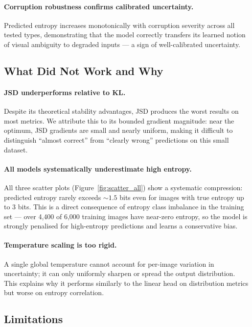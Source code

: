 \documentclass[11pt,a4paper]{article}
\begin{document}
\paragraph{Corruption robustness confirms calibrated uncertainty.}
Predicted entropy increases monotonically with corruption severity across all
tested types, demonstrating that the model correctly transfers its learned
notion of visual ambiguity to degraded inputs — a sign of well-calibrated
uncertainty.

\subsection{What Did Not Work and Why}

\paragraph{JSD underperforms relative to KL.}
Despite its theoretical stability advantages, JSD produces the worst results
on most metrics.
We attribute this to its bounded gradient magnitude: near the optimum, JSD
gradients are small and nearly uniform, making it difficult to distinguish
``almost correct'' from ``clearly wrong'' predictions on this small dataset.

\paragraph{All models systematically underestimate high entropy.}
All three scatter plots (Figure~\ref{fig:scatter_all}) show a systematic
compression: predicted entropy rarely exceeds ${\sim}1.5$ bits even for images
with true entropy up to $3$ bits.
This is a direct consequence of entropy class imbalance in the training set —
over 4,400 of 6,000 training images have near-zero entropy, so the model is
strongly penalised for high-entropy predictions and learns a conservative bias.

\paragraph{Temperature scaling is too rigid.}
A single global temperature cannot account for per-image variation in
uncertainty; it can only uniformly sharpen or spread the output distribution.
This explains why it performs similarly to the linear head on distribution
metrics but worse on entropy correlation.

\subsection{Limitations}
\end{document}
